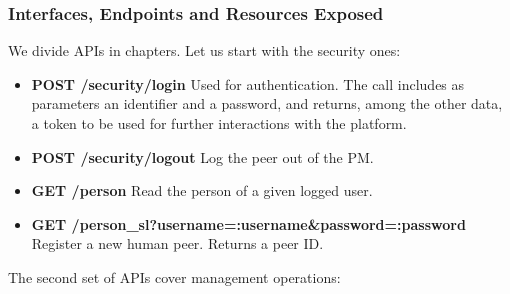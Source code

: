 \subsubsection{Interfaces, Endpoints and Resources Exposed}
We divide APIs in chapters. Let us start with the security ones:
\begin{itemize}
\item {\bf POST /security/login} Used for authentication. The call includes as parameters an identifier and a password, and returns, among the other data, a token to be used for further interactions with the platform.
\item {\bf POST /security/logout} Log the peer out of the PM.
\item {\bf GET /person} Read the person of a given logged user. 
\item {\bf GET /person\_sl?username=:username&password=:password} Register a new human peer. Returns a peer ID. 
\end{itemize}
The second set of APIs cover management operations:
